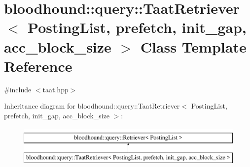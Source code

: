 \hypertarget{classbloodhound_1_1query_1_1TaatRetriever}{}\section{bloodhound\+:\+:query\+:\+:Taat\+Retriever$<$ Posting\+List, prefetch, init\+\_\+gap, acc\+\_\+block\+\_\+size $>$ Class Template Reference}
\label{classbloodhound_1_1query_1_1TaatRetriever}


{\ttfamily \#include $<$taat.\+hpp$>$}

Inheritance diagram for bloodhound\+:\+:query\+:\+:Taat\+Retriever$<$ Posting\+List, prefetch, init\+\_\+gap, acc\+\_\+block\+\_\+size $>$\+:\begin{figure}[H]
\begin{center}
\leavevmode
\includegraphics[height=2.000000cm]{classbloodhound_1_1query_1_1TaatRetriever}
\end{center}
\end{figure}
